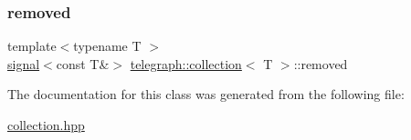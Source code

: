 \mbox{\label{classtelegraph_1_1collection_a6fdb7502f6cef02065c6bbde435756f0}} 
\subsubsection{\texorpdfstring{removed}{removed}}
{\footnotesize\ttfamily template$<$typename T $>$ \\
\hyperlink{classtelegraph_1_1signal}{signal}$<$const T\&$>$ \hyperlink{classtelegraph_1_1collection}{telegraph\+::collection}$<$ T $>$\+::removed}



The documentation for this class was generated from the following file\+:\begin{DoxyCompactItemize}
\item 
\hyperlink{collection_8hpp}{collection.\+hpp}\end{DoxyCompactItemize}
